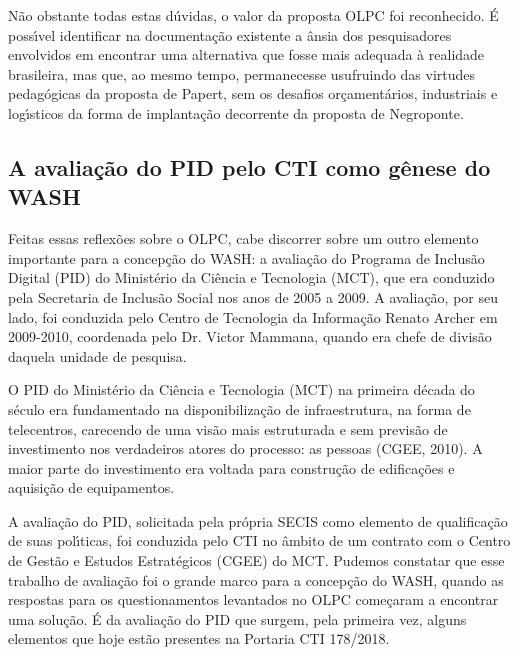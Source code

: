 \documentclass[
12pt,		%
openright,	%
twoside,  %
a4paper,			%
chapter=TITLE,		%
english,			%
french,				%
spanish,			%
brazil				%
]{USPSC-classe/USPSC}
\begin{document}
N\~ao obstante todas estas d\'uvidas, o valor da proposta OLPC foi reconhecido. \'E poss\'{\i}vel identificar na documenta\c{c}\~ao existente a \^ansia dos pesquisadores envolvidos em encontrar uma alternativa que fosse mais adequada \`a realidade brasileira, mas que, ao mesmo tempo, permanecesse usufruindo das virtudes pedag\'ogicas da proposta de Papert, sem os desafios or\c{c}ament\'arios, industriais e log\'{\i}sticos da forma de implanta\c{c}\~ao decorrente da proposta de Negroponte.










\subsection[A avalia\c{c}\~ao do PID pelo CTI como g\^enese do WASH]{A avalia\c{c}\~ao do PID pelo CTI como g\^enese do WASH}\label{A avalia\c{c}\~ao do PID pelo CTI como g\^enese do WASH}
Feitas essas reflex\~oes sobre o OLPC, cabe discorrer sobre um outro elemento importante para a concep\c{c}\~ao do WASH: a avalia\c{c}\~ao do Programa de Inclus\~ao Digital (PID) do Minist\'erio da Ci\^encia e Tecnologia (MCT), que era conduzido pela Secretaria de Inclus\~ao Social nos anos de 2005 a 2009. A avalia\c{c}\~ao, por seu lado, foi conduzida pelo Centro de Tecnologia da Informa\c{c}\~ao Renato Archer em 2009-2010, coordenada pelo Dr. Victor Mammana, quando era chefe de divis\~ao daquela unidade de pesquisa.










O PID do Minist\'erio da Ci\^encia e Tecnologia (MCT) na primeira d\'ecada do s\'eculo era fundamentado na disponibiliza\c{c}\~ao de infraestrutura, na forma de telecentros, carecendo de uma vis\~ao mais estruturada e sem previs\~ao de investimento nos verdadeiros atores do processo: as pessoas (CGEE, 2010). A maior parte do investimento era voltada para constru\c{c}\~ao de edifica\c{c}\~oes e aquisi\c{c}\~ao de equipamentos.










A avalia\c{c}\~ao do PID, solicitada pela pr\'opria SECIS como elemento de qualifica\c{c}\~ao de suas pol\'{\i}ticas, foi conduzida pelo CTI no \^ambito de um contrato com o Centro de Gest\~ao e Estudos Estrat\'egicos (CGEE) do MCT. Pudemos constatar que esse trabalho de avalia\c{c}\~ao foi o grande marco para a concep\c{c}\~ao do WASH, quando as respostas para os questionamentos levantados no OLPC come\c{c}aram a encontrar uma solu\c{c}\~ao. \'E da avalia\c{c}\~ao do PID que surgem, pela primeira vez, alguns elementos que hoje est\~ao presentes na Portaria CTI 178/2018.
\end{document}
